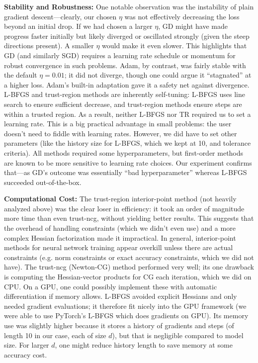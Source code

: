 \documentclass[12pt]{article}
\begin{document}
\textbf{Stability and Robustness:} One notable observation was the instability of plain gradient descent—clearly, our chosen $\eta$ was not effectively decreasing the loss beyond an initial drop. If we had chosen a larger $\eta$, GD might have made progress faster initially but likely diverged or oscillated strongly (given the steep directions present). A smaller $\eta$ would make it even slower. This highlights that GD (and similarly SGD) requires a learning rate schedule or momentum for robust convergence in such problems. Adam, by contrast, was fairly stable with the default $\eta=0.01$; it did not diverge, though one could argue it “stagnated” at a higher loss. Adam’s built-in adaptation gave it a safety net against divergence. L-BFGS and trust-region methods are inherently self-tuning: L-BFGS uses line search to ensure sufficient decrease, and trust-region methods ensure steps are within a trusted region. As a result, neither L-BFGS nor TR required us to set a learning rate. This is a big practical advantage in small problems: the user doesn’t need to fiddle with learning rates. However, we did have to set other parameters (like the history size for L-BFGS, which we kept at 10, and tolerance criteria). All methods required some hyperparameters, but first-order methods are known to be more sensitive to learning rate choices. Our experiment confirms that—as GD’s outcome was essentially “bad hyperparameter” whereas L-BFGS succeeded out-of-the-box.

\textbf{Computational Cost:} The trust-region interior-point method (not heavily analyzed above) was the clear loser in efficiency: it took an order of magnitude more time than even trust-ncg, without yielding better results. This suggests that the overhead of handling constraints (which we didn’t even use) and a more complex Hessian factorization made it impractical. In general, interior-point methods for neural network training appear overkill unless there are actual constraints (e.g. norm constraints or exact accuracy constraints, which we did not have). The trust-ncg (Newton-CG) method performed very well; its one drawback is computing the Hessian-vector products for CG each iteration, which we did on CPU. On a GPU, one could possibly implement these with automatic differentiation if memory allows. L-BFGS avoided explicit Hessians and only needed gradient evaluations; it therefore fit nicely into the GPU framework (we were able to use PyTorch’s L-BFGS which does gradients on GPU). Its memory use was slightly higher because it stores a history of gradients and steps (of length 10 in our case, each of size $d$), but that is negligible compared to model size. For larger $d$, one might reduce history length to save memory at some accuracy cost.
\end{document}
